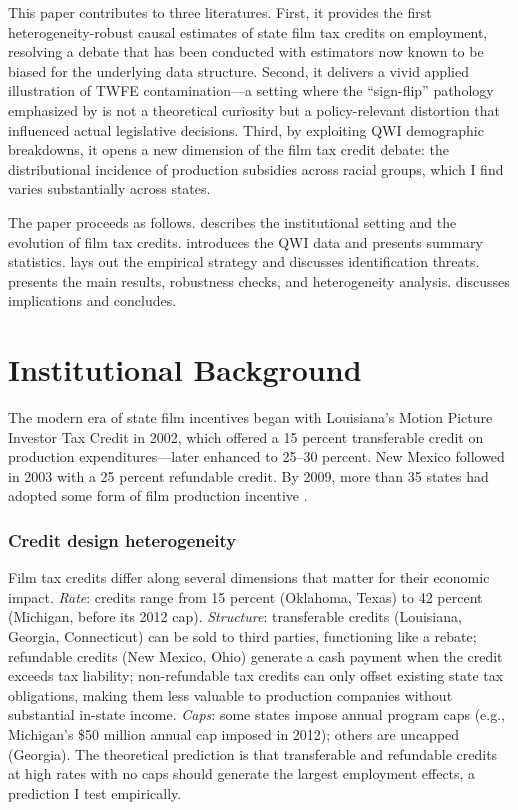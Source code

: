 \documentclass[12pt]{article}
\begin{document}
This paper contributes to three literatures. First, it provides the first heterogeneity-robust causal estimates of state film tax credits on employment, resolving a debate that has been conducted with estimators now known to be biased for the underlying data structure. Second, it delivers a vivid applied illustration of TWFE contamination---a setting where the ``sign-flip'' pathology emphasized by \citet{de2020two} is not a theoretical curiosity but a policy-relevant distortion that influenced actual legislative decisions. Third, by exploiting QWI demographic breakdowns, it opens a new dimension of the film tax credit debate: the distributional incidence of production subsidies across racial groups, which I find varies substantially across states.

The paper proceeds as follows.  describes the institutional setting and the evolution of film tax credits.  introduces the QWI data and presents summary statistics.  lays out the empirical strategy and discusses identification threats.  presents the main results, robustness checks, and heterogeneity analysis.  discusses implications and concludes.


\section{Institutional Background}
\label{sec:background}

The modern era of state film incentives began with Louisiana's Motion Picture Investor Tax Credit in 2002, which offered a 15 percent transferable credit on production expenditures---later enhanced to 25--30 percent. New Mexico followed in 2003 with a 25 percent refundable credit. By 2009, more than 35 states had adopted some form of film production incentive \citep{tannenwald2010state}.

\subsubsection*{Credit design heterogeneity} Film tax credits differ along several dimensions that matter for their economic impact. \emph{Rate}: credits range from 15 percent (Oklahoma, Texas) to 42 percent (Michigan, before its 2012 cap). \emph{Structure}: transferable credits (Louisiana, Georgia, Connecticut) can be sold to third parties, functioning like a rebate; refundable credits (New Mexico, Ohio) generate a cash payment when the credit exceeds tax liability; non-refundable tax credits can only offset existing state tax obligations, making them less valuable to production companies without substantial in-state income. \emph{Caps}: some states impose annual program caps (e.g., Michigan's \$50 million annual cap imposed in 2012); others are uncapped (Georgia). The theoretical prediction is that transferable and refundable credits at high rates with no caps should generate the largest employment effects, a prediction I test empirically.
\end{document}

